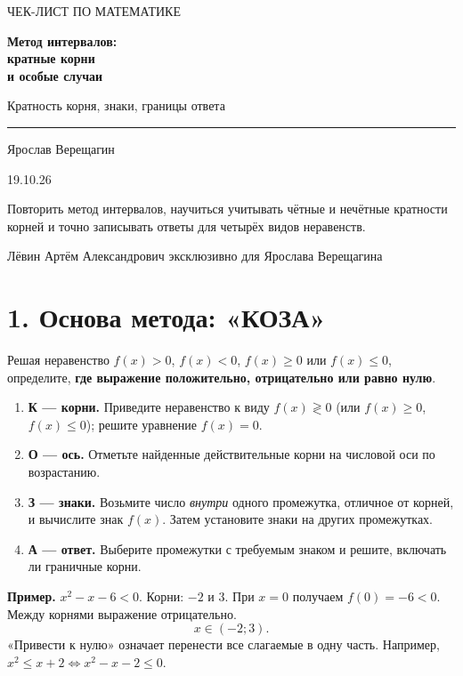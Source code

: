 \documentclass[a4paper,12pt]{article}
\newcommand{\key}[1]{{\color{darkaccent}\textbf{#1}}}
\newcommand{\note}[1]{{\small\color{quiet}#1}}
\newcommand{\headsec}[1]{\section*{\color{darkaccent}#1}\vspace{-6pt}{\color{hair}\rule{\linewidth}{0.55pt}}\par\vspace{2pt}}
\begin{document}
\hypersetup{pageanchor=false}
\begin{titlepage}
\thispagestyle{empty}
\centering
\vspace*{25mm}
{\large\color{quiet}ЧЕК-ЛИСТ ПО МАТЕМАТИКЕ}\par
\vspace{9mm}
{\fontsize{29}{36}\selectfont\bfseries\color{darkaccent}Метод интервалов:\\[1mm]кратные корни\\[1mm]и особые случаи}\par
\vspace{9mm}
{\Large\color{accent}Кратность корня, знаки, границы ответа}\par
\vspace{15mm}
{\color{hair}\rule{0.76\linewidth}{.8pt}}\par
\vspace{9mm}
{\Large Ярослав Верещагин}\par
\vspace{3mm}
{\large 19.10.26}\par
\vfill
\begin{minipage}{.83\linewidth}\centering
Повторить метод интервалов, научиться учитывать чётные и нечётные
кратности корней и точно записывать ответы для четырёх видов неравенств.
\end{minipage}\par
\vspace{13mm}
\par
\vspace{9mm}
{\small\color{quiet}Лёвин Артём Александрович эксклюзивно для Ярослава Верещагина}
\end{titlepage}
\hypersetup{pageanchor=true}

\headsec{1. Основа метода: «КОЗА»}
Решая неравенство \(f(x)>0\), \(f(x)<0\), \(f(x)\ge0\) или \(f(x)\le0\), определите,
\key{где выражение положительно, отрицательно или равно нулю}.

\begin{enumerate}
\item \key{К --- корни.} Приведите неравенство к виду \(f(x)\mathrel{\gtrless}0\) (или \(f(x)\ge0\), \(f(x)\le0\)); решите уравнение \(f(x)=0\).
\item \key{О --- ось.} Отметьте найденные действительные корни на числовой оси по возрастанию.
\item \key{З --- знаки.} Возьмите число \emph{внутри} одного промежутка, отличное от корней, и вычислите знак \(f(x)\). Затем установите знаки на других промежутках.
\item \key{А --- ответ.} Выберите промежутки с требуемым знаком и решите, включать ли граничные корни.
\end{enumerate}
\key{Пример.} \(x^2-x-6<0\). Корни: \(-2\) и \(3\). При \(x=0\) получаем
\(f(0)=-6<0\). Между корнями выражение отрицательно.
\[
\boxed{x\in(-2;3)}.
\]
\note{«Привести к нулю» означает перенести все слагаемые в одну часть. Например,
\(x^2\le x+2\iff x^2-x-2\le0\).}
\end{document}
